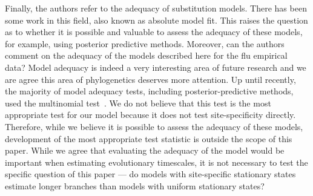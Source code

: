 \documentclass[11pt, oneside]{article}   	%
\newcommand{\response}[1]{{\color{black}#1}}
\begin{document}
Finally, the authors refer to the adequacy of substitution models. 
There has been some work in this field, also known as absolute model fit. 
This raises the question as to whether it is possible and valuable to assess the adequacy of these models, for example, using posterior predictive methods. 
Moreover, can the authors comment on the adequacy of the models described here for the flu empirical data? 
\response{
Model adequacy is indeed a very interesting area of future research and we are agree this area of phylogenetics deserves more attention. 
Up until recently, the majority of model adequacy tests, including posterior-predictive methods, used the multinomial test~\citep{goldman1993statistical, brown2018evaluating}. 
We do not believe that this test is the most appropriate test for our model because it does not test site-specificity directly. 
Therefore, while we believe it is possible to assess the adequacy of these models, development of the most appropriate test statistic is outside the scope of this paper. 
While we agree that evaluating the adequacy of the model would be important when estimating evolutionary timescales, it is not necessary to test the specific question of this paper --- do models with site-specific stationary states estimate longer branches than models with uniform stationary states?
}

\clearpage 
\color{black}

{\small

}
\end{document}
